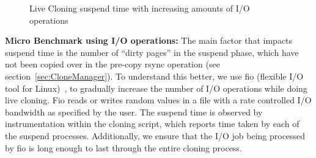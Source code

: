 \begin{figure}[ht]
  \centering
\begin{adjustbox}{max size={.45\textwidth}}
  \end{adjustbox}
  \captionsetup{justification=centering}
  \caption{Live Cloning suspend time with increasing amounts of I/O operations }
  \label{fig:fioResults}
\end{figure}


\noindent
\textbf{Micro Benchmark using I/O operations:}
The main factor that impacts suspend time is the number of ``dirty pages'' in the suspend phase, which have not been copied over in the pre-copy rsync operation (see section~\ref{sec:CloneManager}).
To understand this better, we use fio (flexible I/O tool for Linux)~\cite{fio}, to gradually increase the number of I/O operations while doing live cloning.
Fio reads or writes random values in a file with a rate controlled I/O bandwidth as specified by the user. 
The suspend time is observed by instrumentation within the cloning script, which reports time taken by each of the suspend processes.
Additionally, we ensure that the I/O job being processed by fio is long enough to last through the entire cloning process.

